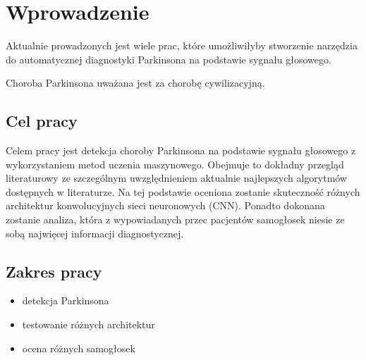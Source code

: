 \chapter{Wprowadzenie} \label{ch:wprowadzenie}

Aktualnie prowadzonych jest wiele prac, które umożliwiłyby stworzenie narzędzia do automatycznej diagnostyki Parkinsona na podstawie sygnału głosowego.

Choroba Parkinsona uważana jest za chorobę cywilizacyjną.


\section{Cel pracy}
\label{sec:celPracy}

Celem pracy jest detekcja choroby Parkinsona na podstawie sygnału głosowego z wykorzystaniem metod uczenia maszynowego.
Obejmuje to dokładny przegląd literaturowy ze szczególnym uwzględnieniem aktualnie najlepszych algorytmów
dostępnych w literaturze.
Na tej podstawie oceniona zostanie skuteczność różnych architektur konwolucyjnych sieci
neuronowych (CNN).
Ponadto dokonana zostanie analiza, która z wypowiadanych przec pacjentów samogłosek niesie ze sobą
najwięcej informacji diagnostycznej.


\section{Zakres pracy}
\label{sec:zakresPracy}

\begin{itemize}
\item
detekcja Parkinsona

\item
testowanie różnych architektur

\item ocena różnych samogłosek
\end{itemize}